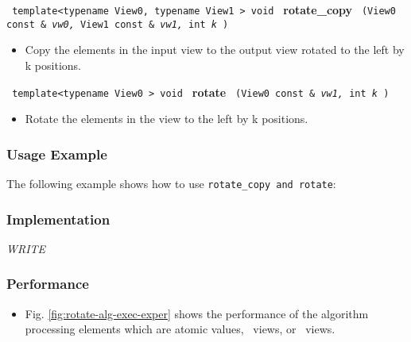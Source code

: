 \noindent
\texttt{%
template<typename View0, typename View1 >
\newline
void 
}
\newline
\textbf{rotate\_copy}%
\texttt{%
(View0 const \&
\textit{vw0,}%
View1 const \&
\textit{vw1,}%
int 
\textit{k}%
)
}

\begin{itemize}
\item
Copy the elements in the input view to the output view rotated to the left by k positions. 
\end{itemize}
 
\noindent
\texttt{%
template<typename View0 >
\newline
void 
}
\newline
\textbf{rotate}%
\texttt{%
(View0 const \&
\textit{vw1,}%
int 
\textit{k}%
)
}
\vspace{0.4cm}

\begin{itemize}
\item
Rotate the elements in the view to the left by k positions. 
\end{itemize}

\subsubsection{Usage Example} %

The following example shows how to use \texttt{rotate\_copy and rotate}:

 
\subsubsection{Implementation} %

\textit{WRITE}

\subsubsection{Performance} %

\begin{itemize}
\item
Fig. \ref{fig:rotate-alg-exec-exper}
shows the performance of the algorithm processing
elements which are atomic values, \stl\ views, or \stapl\ views.
\end{itemize}

